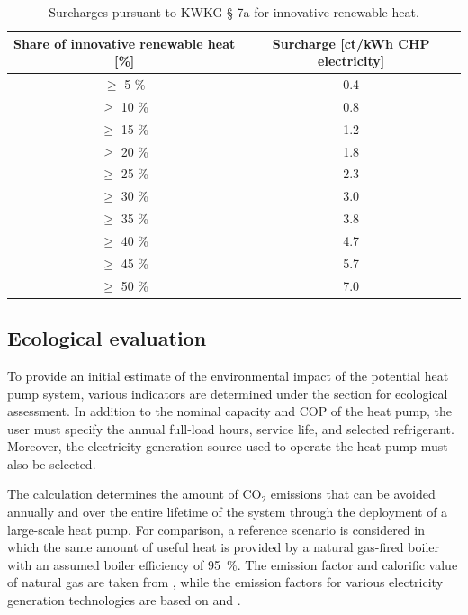 \documentclass[letterpaper,11pt]{article}
\begin{document}
		
		\begin{table}[!ht] 
			\centering 
			\caption{Surcharges pursuant to KWKG § 7a for innovative renewable heat.}
			\begin{tabular}{ c c } 
				\hline 
				\textbf{Share of innovative renewable heat [\%]} & \textbf{Surcharge [ct/kWh CHP electricity]}  \\ 
				\hline 
				$\geq$ 5 \% & 0.4 \\
				$\geq$ 10 \% & 0.8 \\
				$\geq$ 15 \% & 1.2 \\
				$\geq$ 20 \% & 1.8 \\
				$\geq$ 25 \% & 2.3 \\
				$\geq$ 30 \% & 3.0 \\
				$\geq$ 35 \% & 3.8 \\
				$\geq$ 40 \% & 4.7 \\
				$\geq$ 45 \% & 5.7 \\
				$\geq$ 50 \% & 7.0 \\
				\hline 
			\end{tabular} 
			\label{tab:kwkgzuschlag} 
		\end{table}
		
		

	
	\subsection{Ecological evaluation}
	
	To provide an initial estimate of the environmental impact of the potential heat pump system, various indicators are determined under the section for ecological assessment. In addition to the nominal capacity and COP of the heat pump, the user must specify the annual full-load hours, service life, and selected refrigerant. Moreover, the electricity generation source used to operate the heat pump must also be selected.
	
	The calculation determines the amount of CO$_2$ emissions that can be avoided annually and over the entire lifetime of the system through the deployment of a large-scale heat pump. For comparison, a reference scenario is considered in which the same amount of useful heat is provided by a natural gas-fired boiler with an assumed boiler efficiency of 95~\%. The emission factor and calorific value of natural gas are taken from \cite{Juhrich2022}, while the emission factors for various electricity generation technologies are based on \cite{Lauf2022} and \cite{Icha2023}. %
	
\end{document}
